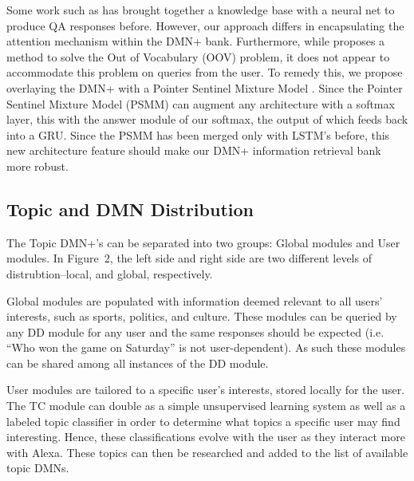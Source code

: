 \documentclass[10pt,twoside,twocolumn]{article}
\begin{document}
\noindent
Some work such as \cite{Zhang2016} has brought together a knowledge base with a neural net to produce QA responses before. However, our approach differs in encapsulating the attention mechanism within the DMN+ bank. Furthermore, while \cite{Zhang2016} proposes a method to solve the Out of Vocabulary (OOV) problem, it does not appear to accommodate this problem on queries from the user. To remedy this, we propose overlaying the DMN+ \cite{Xiong2016} with a Pointer Sentinel Mixture Model \cite{Merity2016}. Since the Pointer Sentinel Mixture Model (PSMM) can augment any architecture with a softmax layer, this with the answer module of our softmax, the output of which feeds back into a GRU. Since the PSMM has been merged only with LSTM's before, this new architecture feature should make our DMN+ information retrieval bank more robust.



\subsection{Topic and DMN Distribution}
The Topic DMN+'s can be separated into two groups: Global modules and User modules. In Figure~2, the left side and right side are two different levels of distrubtion--local, and global, respectively.

\noindent
Global modules are populated with information deemed relevant to all users' interests, such as sports, politics, and culture. These modules can be queried by any DD module for any user and the same responses should be expected (i.e. ``Who won the game on Saturday'' is not user-dependent). As such these modules can be shared among all instances of the DD module.

\noindent
User modules are tailored to a specific user's interests, stored locally for the user. The TC module can double as a simple unsupervised learning system as well as a labeled topic classifier in order to determine what topics a specific user may find interesting. Hence, these classifications evolve with the user as they interact more with Alexa. These topics can then be researched and added to the list of available topic DMNs.
\end{document}
